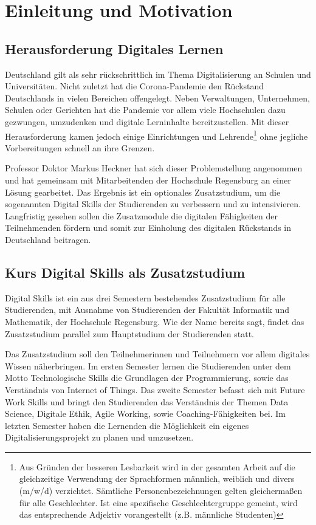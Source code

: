 \section{Einleitung und Motivation}\label{einleitung}
\subsection{Herausforderung Digitales Lernen}\label{herausforderung}
Deutschland gilt als sehr rückschrittlich im Thema Digitalisierung an Schulen
und Universitäten. Nicht zuletzt hat die Corona-Pandemie den Rückstand
Deutschlands in vielen Bereichen offengelegt. Neben Verwaltungen, Unternehmen,
Schulen oder Gerichten hat die Pandemie vor allem viele Hochschulen dazu
gezwungen, umzudenken und digitale Lerninhalte bereitzustellen. Mit dieser
Herausforderung kamen jedoch einige Einrichtungen und Lehrende\footnote{Aus
Gründen der besseren Lesbarkeit wird in der gesamten Arbeit auf die
gleichzeitige Verwendung der Sprachformen männlich, weiblich und divers (m/w/d)
verzichtet. Sämtliche Personenbezeichnungen gelten gleichermaßen für alle
Geschlechter. Ist eine spezifische Geschlechtergruppe gemeint, wird das
entsprechende Adjektiv vorangestellt (z.B. \glqq männliche Studenten\grqq)} ohne
jegliche Vorbereitungen schnell an ihre Grenzen. \parencite{bmwi-rueckstand}

Professor Doktor Markus Heckner hat sich dieser Problemstellung angenommen und
hat gemeinsam mit Mitarbeitenden der Hochschule Regensburg an einer Lösung
gearbeitet. Das Ergebnis ist ein optionales Zusatzstudium, um die sogenannten
\glqq Digital Skills\grqq{} der Studierenden zu verbessern und zu intensivieren.
Langfristig gesehen sollen die Zusatzmodule die digitalen Fähigkeiten der
Teilnehmenden fördern und somit zur Einholung des digitalen Rückstands in
Deutschland beitragen. \parencite{digital-skills}

\subsection{Kurs Digital Skills als Zusatzstudium}\label{kurs-digital-skills}
Digital Skills ist ein aus drei Semestern bestehendes Zusatzstudium für alle
Studierenden, mit Ausnahme von Studierenden der Fakultät Informatik und
Mathematik, der Hochschule Regensburg. Wie der Name bereits sagt, findet das
Zusatzstudium parallel zum Hauptstudium der Studierenden statt.

Das Zusatzstudium soll den Teilnehmerinnen und Teilnehmern vor allem digitales
Wissen näherbringen. Im ersten Semester lernen die Studierenden unter dem Motto
\glqq Technologische Skills\grqq{} die Grundlagen der Programmierung, sowie das
Verständnis von Internet of Things. Das zweite Semester befasst sich mit
\glqq Future Work Skills\grqq{} und bringt den Studierenden das Verständnis der
Themen \glqq Data Science\grqq{}, \glqq Digitale Ethik\grqq{},
\glqq Agile Working\grqq{}, sowie \glqq Coaching-Fähigkeiten\grqq{} bei. Im
letzten Semester haben die Lernenden die Möglichkeit ein eigenes
Digitalisierungsprojekt zu planen und umzusetzen.

